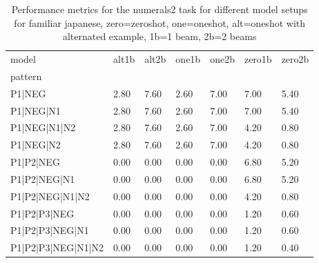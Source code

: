 \begin{table}[h]
\begin{tabular}{l|llllll}
\toprule
model & alt1b & alt2b & one1b & one2b & zero1b & zero2b \\
pattern &  &  &  &  &  &  \\
\midrule
P1|NEG & 2.80 & 7.60 & 2.60 & 7.00 & 7.00 & 5.40 \\
P1|NEG|N1 & 2.80 & 7.60 & 2.60 & 7.00 & 7.00 & 5.40 \\
P1|NEG|N1|N2 & 2.80 & 7.60 & 2.60 & 7.00 & 4.20 & 0.80 \\
P1|NEG|N2 & 2.80 & 7.60 & 2.60 & 7.00 & 4.20 & 0.80 \\
P1|P2|NEG & 0.00 & 0.00 & 0.00 & 0.00 & 6.80 & 5.20 \\
P1|P2|NEG|N1 & 0.00 & 0.00 & 0.00 & 0.00 & 6.80 & 5.20 \\
P1|P2|NEG|N1|N2 & 0.00 & 0.00 & 0.00 & 0.00 & 4.20 & 0.80 \\
P1|P2|P3|NEG & 0.00 & 0.00 & 0.00 & 0.00 & 1.20 & 0.60 \\
P1|P2|P3|NEG|N1 & 0.00 & 0.00 & 0.00 & 0.00 & 1.20 & 0.60 \\
P1|P2|P3|NEG|N1|N2 & 0.00 & 0.00 & 0.00 & 0.00 & 1.20 & 0.40 \\
\bottomrule
\end{tabular}
\caption{Performance metrics for the numerals2 task for different model setups for familiar japanese, zero=zeroshot, one=oneshot, alt=oneshot with alternated example, 1b=1 beam, 2b=2 beams}
\label{tab:ja fam_numerals2_performance}
\end{table}
